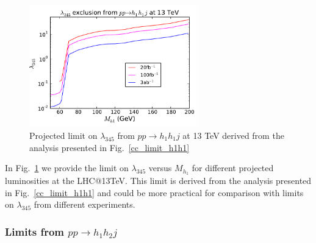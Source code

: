 \documentclass[12pt,a4paper]{article}
\begin{document}
\begin{figure}[h!]
\centering
 \includegraphics[width=0.65\textwidth]{./lam345_limit_lhc13.pdf}
\caption{Projected limit on $\lambda_{345}$ from  $pp \to h_1 h_1 j$ at 13 TeV
derived from the analysis presented in Fig.~\ref{cc_limit_h1h1} \label{lam345_coll_limit}}
\end{figure}


In Fig.~\ref{lam345_coll_limit} we provide the  limit on $\lambda_{345}$ versus $M_{h_1}$ for different projected luminosities at the LHC@13TeV. This limit is derived from the analysis presented in Fig.~\ref{cc_limit_h1h1} and could be more practical 
for comparison with limits on $\lambda_{345}$ from different experiments.


\subsubsection{Limits from $pp\rightarrow h_1h_2 j$}
\end{document}
